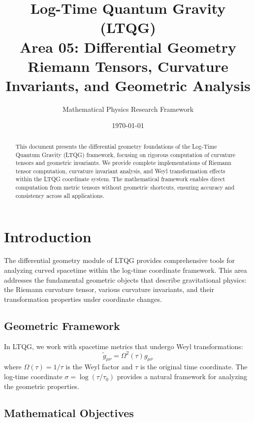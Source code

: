 \documentclass[11pt,a4paper]{article}
\title{\textbf{Log-Time Quantum Gravity (LTQG)}\\
\Large Area 05: Differential Geometry\\
\large Riemann Tensors, Curvature Invariants, and Geometric Analysis}
\author{Mathematical Physics Research Framework}
\date{\today}
\theoremstyle{definition}
\theoremstyle{remark}
\renewcommand{\tilde}[1]{\widetilde{#1}}
\begin{document}
\maketitle

\begin{abstract}
This document presents the differential geometry foundations of the Log-Time Quantum Gravity (LTQG) framework, focusing on rigorous computation of curvature tensors and geometric invariants. We provide complete implementations of Riemann tensor computation, curvature invariant analysis, and Weyl transformation effects within the LTQG coordinate system. The mathematical framework enables direct computation from metric tensors without geometric shortcuts, ensuring accuracy and consistency across all applications.
\end{abstract}

\tableofcontents
\newpage

\section{Introduction}

The differential geometry module of LTQG provides comprehensive tools for analyzing curved spacetime within the log-time coordinate framework. This area addresses the fundamental geometric objects that describe gravitational physics: the Riemann curvature tensor, various curvature invariants, and their transformation properties under coordinate changes.

\subsection{Geometric Framework}

In LTQG, we work with spacetime metrics that undergo Weyl transformations:
\begin{equation}
\tilde{g}_{\mu\nu} = \Omega^2(\tau) g_{\mu\nu}
\end{equation}
where $\Omega(\tau) = 1/\tau$ is the Weyl factor and $\tau$ is the original time coordinate. The log-time coordinate $\sigma = \log(\tau/\tau_0)$ provides a natural framework for analyzing the geometric properties.

\subsection{Mathematical Objectives}
\end{document}
